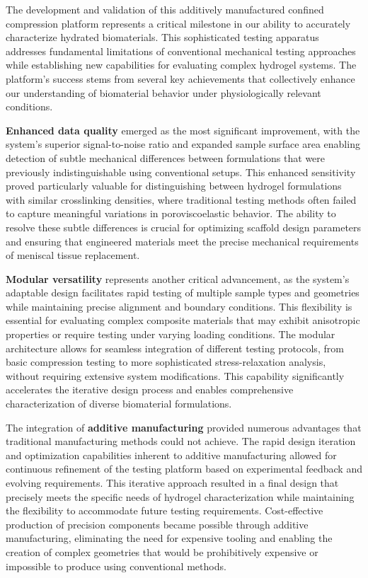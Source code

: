 The development and validation of this additively manufactured confined compression platform represents a critical milestone in our ability to accurately characterize hydrated biomaterials. This sophisticated testing apparatus addresses fundamental limitations of conventional mechanical testing approaches while establishing new capabilities for evaluating complex hydrogel systems. The platform's success stems from several key achievements that collectively enhance our understanding of biomaterial behavior under physiologically relevant conditions.

{\bf Enhanced data quality} emerged as the most significant improvement, with the system's superior signal-to-noise ratio and expanded sample surface area enabling detection of subtle mechanical differences between formulations that were previously indistinguishable using conventional setups. This enhanced sensitivity proved particularly valuable for distinguishing between hydrogel formulations with similar crosslinking densities, where traditional testing methods often failed to capture meaningful variations in poroviscoelastic behavior. The ability to resolve these subtle differences is crucial for optimizing scaffold design parameters and ensuring that engineered materials meet the precise mechanical requirements of meniscal tissue replacement.

{\bf Modular versatility} represents another critical advancement, as the system's adaptable design facilitates rapid testing of multiple sample types and geometries while maintaining precise alignment and boundary conditions. This flexibility is essential for evaluating complex composite materials that may exhibit anisotropic properties or require testing under varying loading conditions. The modular architecture allows for seamless integration of different testing protocols, from basic compression testing to more sophisticated stress-relaxation analysis, without requiring extensive system modifications. This capability significantly accelerates the iterative design process and enables comprehensive characterization of diverse biomaterial formulations.

The integration of {\bf additive manufacturing} provided numerous advantages that traditional manufacturing methods could not achieve. The rapid design iteration and optimization capabilities inherent to additive manufacturing allowed for continuous refinement of the testing platform based on experimental feedback and evolving requirements. This iterative approach resulted in a final design that precisely meets the specific needs of hydrogel characterization while maintaining the flexibility to accommodate future testing requirements. Cost-effective production of precision components became possible through additive manufacturing, eliminating the need for expensive tooling and enabling the creation of complex geometries that would be prohibitively expensive or impossible to produce using conventional methods.

